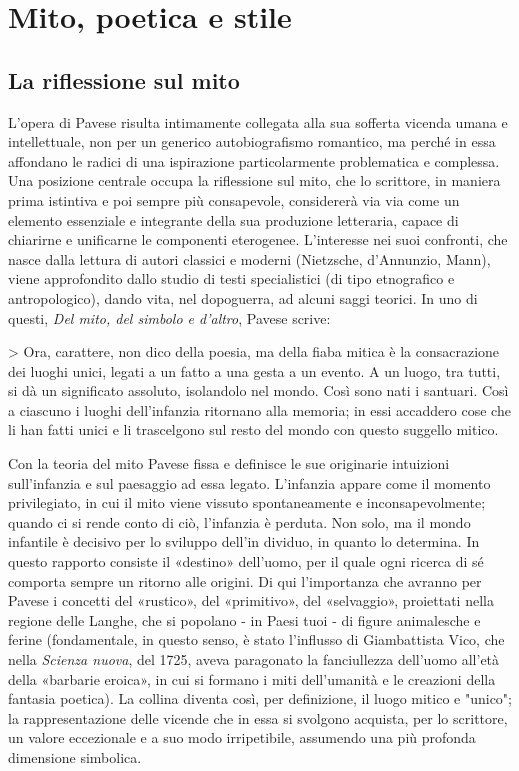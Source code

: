 \section{Mito, poetica e stile}

\subsection{La riflessione sul mito}

L'opera di Pavese risulta intimamente collegata alla sua sofferta vicenda umana e intellettuale, non per un generico autobiografismo romantico, ma perché in essa affondano le radici di una ispirazione particolarmente problematica e complessa. Una posizione centrale occupa la riflessione sul mito, che lo scrittore, in maniera prima istintiva e poi sempre più consapevole, considererà via via come un elemento essenziale e integrante della sua produzione letteraria, capace di chiarirne e unificarne le componenti eterogenee. L'interesse nei suoi confronti, che nasce dalla lettura di autori classici e moderni (Nietzsche, d'Annunzio, Mann), viene approfondito dallo studio di testi specialistici (di tipo etnografico e antropologico), dando vita, nel dopoguerra, ad alcuni saggi teorici. In uno di questi, \textit{Del mito, del simbolo e d'altro}, Pavese scrive:

> Ora, carattere, non dico della poesia, ma della fiaba mitica è la consacrazione dei luoghi unici, legati a un fatto a una gesta a un evento. A un luogo, tra tutti, si dà un significato assoluto, isolandolo nel mondo. Così sono nati i santuari. Così a ciascuno i luoghi dell'infanzia ritornano alla memoria; in essi accaddero cose che li han fatti unici e li trascelgono sul resto del mondo con questo suggello mitico.

Con la teoria del mito Pavese fissa e definisce le sue originarie intuizioni sull'infanzia e sul paesaggio ad essa legato. L'infanzia appare come il momento privilegiato, in cui il mito viene vissuto spontaneamente e inconsapevolmente; quando ci si rende conto di ciò, l'infanzia è perduta. Non solo, ma il mondo infantile è decisivo per lo sviluppo dell'in dividuo, in quanto lo determina. In questo rapporto consiste il «destino» dell'uomo, per il quale ogni ricerca di sé comporta sempre un ritorno alle origini. Di qui l'importanza che avranno per Pavese i concetti del «rustico», del «primitivo», del «selvaggio», proiettati nella regione delle Langhe, che si popolano - in Paesi tuoi - di figure animalesche e ferine (fondamentale, in questo senso, è stato l'influsso di Giambattista Vico, che nella \textit{Scienza nuova}, del 1725, aveva paragonato la fanciullezza dell'uomo all'età della «barbarie eroica», in cui si formano i miti dell'umanità e le creazioni della fantasia poetica). La collina diventa così, per definizione, il luogo mitico e "unico"; la rappresentazione delle vicende che in essa si svolgono acquista, per lo scrittore, un valore eccezionale e a suo modo irripetibile, assumendo una più profonda dimensione simbolica.

